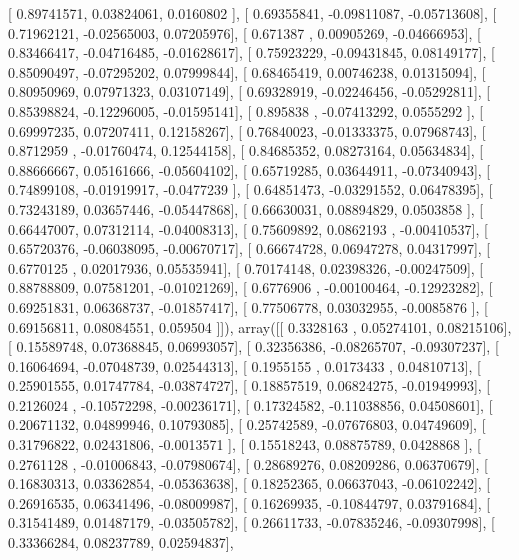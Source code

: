 \documentclass{article}
\begin{document}
       [ 0.89741571,  0.03824061,  0.0160802 ],
       [ 0.69355841, -0.09811087, -0.05713608],
       [ 0.71962121, -0.02565003,  0.07205976],
       [ 0.671387  ,  0.00905269, -0.04666953],
       [ 0.83466417, -0.04716485, -0.01628617],
       [ 0.75923229, -0.09431845,  0.08149177],
       [ 0.85090497, -0.07295202,  0.07999844],
       [ 0.68465419,  0.00746238,  0.01315094],
       [ 0.80950969,  0.07971323,  0.03107149],
       [ 0.69328919, -0.02246456, -0.05292811],
       [ 0.85398824, -0.12296005, -0.01595141],
       [ 0.895838  , -0.07413292,  0.0555292 ],
       [ 0.69997235,  0.07207411,  0.12158267],
       [ 0.76840023, -0.01333375,  0.07968743],
       [ 0.8712959 , -0.01760474,  0.12544158],
       [ 0.84685352,  0.08273164,  0.05634834],
       [ 0.88666667,  0.05161666, -0.05604102],
       [ 0.65719285,  0.03644911, -0.07340943],
       [ 0.74899108, -0.01919917, -0.0477239 ],
       [ 0.64851473, -0.03291552,  0.06478395],
       [ 0.73243189,  0.03657446, -0.05447868],
       [ 0.66630031,  0.08894829,  0.0503858 ],
       [ 0.66447007,  0.07312114, -0.04008313],
       [ 0.75609892,  0.0862193 , -0.00410537],
       [ 0.65720376, -0.06038095, -0.00670717],
       [ 0.66674728,  0.06947278,  0.04317997],
       [ 0.6770125 ,  0.02017936,  0.05535941],
       [ 0.70174148,  0.02398326, -0.00247509],
       [ 0.88788809,  0.07581201, -0.01021269],
       [ 0.6776906 , -0.00100464, -0.12923282],
       [ 0.69251831,  0.06368737, -0.01857417],
       [ 0.77506778,  0.03032955, -0.0085876 ],
       [ 0.69156811,  0.08084551,  0.059504  ]]), array([[ 0.3328163 ,  0.05274101,  0.08215106],
       [ 0.15589748,  0.07368845,  0.06993057],
       [ 0.32356386, -0.08265707, -0.09307237],
       [ 0.16064694, -0.07048739,  0.02544313],
       [ 0.1955155 ,  0.0173433 ,  0.04810713],
       [ 0.25901555,  0.01747784, -0.03874727],
       [ 0.18857519,  0.06824275, -0.01949993],
       [ 0.2126024 , -0.10572298, -0.00236171],
       [ 0.17324582, -0.11038856,  0.04508601],
       [ 0.20671132,  0.04899946,  0.10793085],
       [ 0.25742589, -0.07676803,  0.04749609],
       [ 0.31796822,  0.02431806, -0.0013571 ],
       [ 0.15518243,  0.08875789,  0.0428868 ],
       [ 0.2761128 , -0.01006843, -0.07980674],
       [ 0.28689276,  0.08209286,  0.06370679],
       [ 0.16830313,  0.03362854, -0.05363638],
       [ 0.18252365,  0.06637043, -0.06102242],
       [ 0.26916535,  0.06341496, -0.08009987],
       [ 0.16269935, -0.10844797,  0.03791684],
       [ 0.31541489,  0.01487179, -0.03505782],
       [ 0.26611733, -0.07835246, -0.09307998],
       [ 0.33366284,  0.08237789,  0.02594837],
\end{document}
